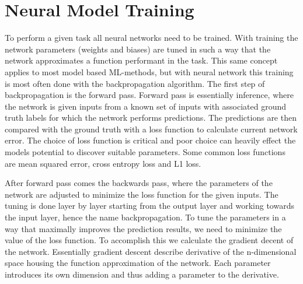 \documentclass[12pt,a4paper,english
]{tunithesis}
\begin{document}
\section{Neural Model Training}
To perform a given task all neural networks need to be trained. With training the network parameters (weights and biases) are tuned in such a way that the network approximates a function performant in the task. This same concept applies to most model based ML-methods, but with neural network this training is most often done with the backpropagation algorithm. The first step of backpropagation is the forward pass. Forward pass is essentially inference, where the network is given inputs from a known set of inputs with associated ground truth labels for which the network performs predictions. The predictions are then compared with the ground truth with a loss function to calculate current network error. The choice of loss function is critical and poor choice can heavily effect the models potential to discover suitable parameters. Some common loss functions are mean squared error, cross entropy loss and L1 loss.

After forward pass comes the backwards pass, where the parameters of the network are adjusted to minimize the loss function for the given inputs. The tuning is done layer by layer starting from the output layer and working towards the input layer, hence the name backpropagation. To tune the parameters in a way that maximally improves the prediction results, we need to minimize the value of the loss function. To accomplish this we calculate the gradient decent of the network. Essentially gradient descent describe derivative of the n-dimensional space housing the function approximation of the network. Each parameter introduces its own dimension and thus adding a parameter to the derivative.
\end{document}
